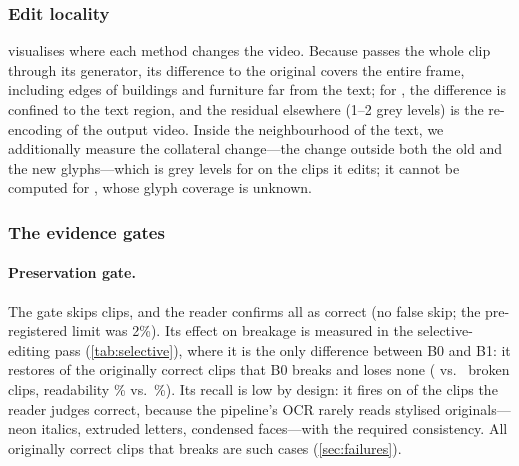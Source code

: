 \subsubsection{Edit locality}
\label{sec:exp_local}
 visualises where each method changes the video. Because \steer passes the whole clip through its generator, its difference to the original covers the entire frame, including edges of buildings and furniture far from the text; for \method, the difference is confined to the text region, and the residual elsewhere (1--2 grey levels) is the re-encoding of the output video. Inside the neighbourhood of the text, we additionally measure the collateral change---the change outside both the old and the new glyphs---which is \rOursCollat{} grey levels for \method on the \rOursCollatN{} clips it edits; it cannot be computed for \steer, whose glyph coverage is unknown.

\subsubsection{The evidence gates}
\label{sec:exp_gates}
\paragraph{Preservation gate.} The gate skips \rSkipped{} clips, and the reader confirms all \rSkippedOK{} as correct (no false skip; the pre-registered limit was 2\%). Its effect on breakage is measured in the selective-editing pass (\cref{tab:selective}), where it is the only difference between B0 and B1: it restores \sRestored{} of the \sBrokenBzero{} originally correct clips that B0 breaks and loses none (\sBrokenBzero{} vs.\ \sBrokenBone{} broken clips, readability \sReadBzero\% vs.\ \sReadBone\%). Its recall is low by design: it fires on \rSkipped{} of the \rOrigCorrect{} clips the reader judges correct, because the pipeline's OCR rarely reads stylised originals---neon italics, extruded letters, condensed faces---with the required consistency. All \rOursBroken{} originally correct clips that \method breaks are such cases (\cref{sec:failures}).







